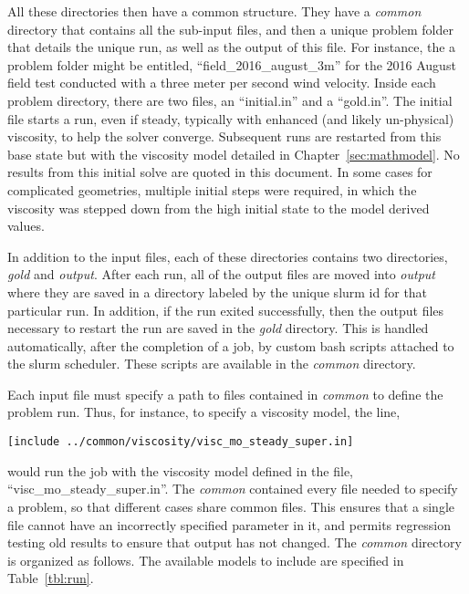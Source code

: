 All these directories then have a common structure. They have a {\it
common} directory that contains all the sub-input files, and then a
unique problem folder that details the unique run, as well as the output
of this file. For instance, the a problem folder might be entitled,
``field\_2016\_august\_3m'' for the 2016 August field test conducted
with a three meter per second wind velocity. Inside each problem
directory, there are two files, an ``initial.in'' and a ``gold.in''. The
initial file starts a run, even if steady, typically with enhanced (and
likely un-physical) viscosity, to help the solver converge. Subsequent
runs are restarted from this base state but with the viscosity model
detailed in Chapter~\ref{sec:mathmodel}. No results from this initial
solve are quoted in this document. In some cases for complicated
geometries, multiple initial steps were required, in which the viscosity
was stepped down from the high initial state to the model derived
values. 

In addition to the input files, each of these directories contains two
directories, {\it gold} and {\it output}. After each run, all of the
output files are moved into {\it output} where they are saved in a
directory labeled by the unique slurm id for that particular run. In
addition, if the run exited successfully, then the output files
necessary to restart the run are saved in the {\it gold} directory. 
This is handled automatically, after the completion of a job, by custom
bash scripts attached to the slurm scheduler. These scripts are
available in the {\it common} directory. 

Each input file must specify a path to files contained in {\it common}
to define the problem run. Thus, for instance, to specify a viscosity
model, the line, 
\begin{verbatim}
[include ../common/viscosity/visc_mo_steady_super.in]
\end{verbatim}
would run the job with the viscosity model defined in the file,
``visc\_mo\_steady\_super.in''.  
The {\it common} contained every file needed to specify a problem, so
that different cases share common files. This ensures that a single file
cannot have an incorrectly specified parameter in it, and permits
regression testing old results to ensure that output has not changed. 
The {\it common} directory is organized as follows. The available models
to include are specified in Table~\ref{tbl:run}. 

